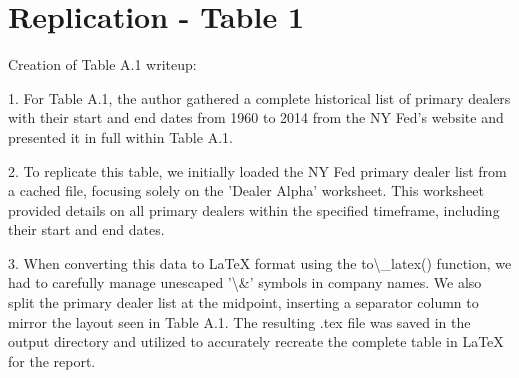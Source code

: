 \documentclass{article}
\begin{document}
\par

\small {\section{Replication - Table 1}}

\begin{table}[!htbp]
\centering
\begin{adjustbox}{width=\textwidth,center}

\end{adjustbox}
\end{table}

\par
Creation of Table A.1 writeup:

1. For Table A.1, the author gathered a complete historical list of primary dealers with their start
and end dates from 1960 to 2014 from the NY Fed's website and presented it in full within Table A.1. 

2. To replicate this table, we initially loaded the NY Fed primary dealer list from a cached file, 
focusing solely on the 'Dealer Alpha' worksheet. This worksheet provided details on all primary dealers 
within the specified timeframe, including their start and end dates.

3. When converting this data to LaTeX format using the to\textbackslash{}_latex() function, we had to carefully manage 
unescaped '\textbackslash{}&' symbols in company names. We also split the primary dealer list at the midpoint, inserting 
a separator column to mirror the layout seen in Table A.1. The resulting .tex file was saved in the output 
directory and utilized to accurately recreate the complete table in LaTeX for the report.
\end{document}
